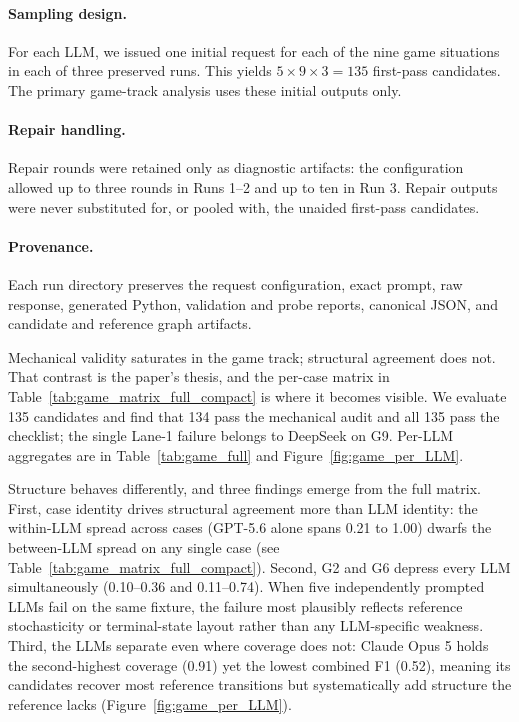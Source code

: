 \documentclass{article}
\begin{document}
  \paragraph{Sampling design.}
  For each LLM, we issued one initial request for each of the nine game
  situations in each of three preserved runs. This yields
  $5 \times 9 \times 3 = 135$ first-pass candidates. The primary game-track
  analysis uses these initial outputs only.

  \paragraph{Repair handling.}
  Repair rounds were retained only as diagnostic artifacts: the configuration
  allowed up to three rounds in Runs 1--2 and up to ten in Run 3. Repair outputs
  were never substituted for, or pooled with, the unaided first-pass candidates.

  \paragraph{Provenance.}
  Each run directory preserves the request configuration, exact prompt, raw
  response, generated Python, validation and probe reports, canonical JSON, and
  candidate and reference graph artifacts.


Mechanical validity saturates in the game track; structural agreement does not. That contrast is the paper's thesis, and the per-case matrix in Table~\ref{tab:game_matrix_full_compact} is where it becomes visible. We evaluate 135 candidates and find that 134 pass the mechanical audit and all 135 pass the checklist; the single Lane-1 failure belongs to DeepSeek on G9. Per-LLM aggregates are in Table~\ref{tab:game_full} and Figure~\ref{fig:game_per_LLM}.

Structure behaves differently, and three findings emerge from the full matrix. First, case identity drives structural agreement more than LLM identity: the within-LLM spread across cases (GPT-5.6 alone spans 0.21 to 1.00) dwarfs the between-LLM spread on any single case (see Table~\ref{tab:game_matrix_full_compact}). Second, G2 and G6 depress every LLM simultaneously (0.10--0.36 and 0.11--0.74). When five independently prompted LLMs fail on the same fixture, the failure most plausibly reflects reference stochasticity or terminal-state layout rather than any LLM-specific weakness. Third, the LLMs separate even where coverage does not: Claude Opus 5 holds the second-highest coverage (0.91) yet the lowest combined F1 (0.52), meaning its candidates recover most reference transitions but systematically add structure the reference lacks (Figure~\ref{fig:game_per_LLM}).
\end{document}
